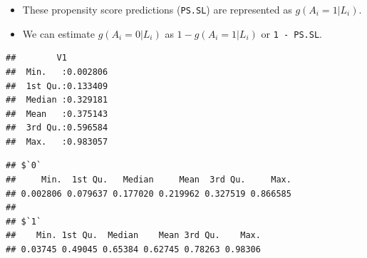 \documentclass[
]{book}
\newenvironment{Shaded}{\begin{snugshade}}{\end{snugshade}}
\newcommand{\AttributeTok}[1]{\textcolor[rgb]{0.77,0.63,0.00}{#1}}
\newcommand{\DecValTok}[1]{\textcolor[rgb]{0.00,0.00,0.81}{#1}}
\newcommand{\FunctionTok}[1]{\textcolor[rgb]{0.00,0.00,0.00}{#1}}
\newcommand{\NormalTok}[1]{#1}
\newcommand{\SpecialCharTok}[1]{\textcolor[rgb]{0.00,0.00,0.00}{#1}}
\newcommand{\StringTok}[1]{\textcolor[rgb]{0.31,0.60,0.02}{#1}}
\providecommand{\tightlist}{%
  \setlength{\itemsep}{0pt}\setlength{\parskip}{0pt}}
\begin{document}
\begin{itemize}
\tightlist
\item
  These propensity score predictions (\texttt{PS.SL}) are represented as \(g(A_i=1|L_i)\).
\item
  We can estimate \(g(A_i=0|L_i)\) as \(1 - g(A_i=1|L_i)\) or \texttt{1\ -\ PS.SL}.
\end{itemize}

\begin{Shaded}
\end{Shaded}

\begin{verbatim}
##        V1          
##  Min.   :0.002806  
##  1st Qu.:0.133409  
##  Median :0.329181  
##  Mean   :0.375143  
##  3rd Qu.:0.596584  
##  Max.   :0.983057
\end{verbatim}

\begin{Shaded}
\end{Shaded}

\begin{verbatim}
## $`0`
##     Min.  1st Qu.   Median     Mean  3rd Qu.     Max. 
## 0.002806 0.079637 0.177020 0.219962 0.327519 0.866585 
## 
## $`1`
##    Min. 1st Qu.  Median    Mean 3rd Qu.    Max. 
## 0.03745 0.49045 0.65384 0.62745 0.78263 0.98306
\end{verbatim}

\begin{Shaded}
\end{Shaded}
\end{document}
